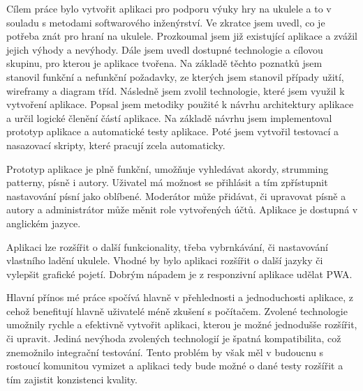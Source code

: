 \begin{conclusion}
    Cílem práce bylo vytvořit aplikaci pro podporu výuky hry na ukulele a to v souladu s metodami softwarového inženýrství. Ve zkratce jsem uvedl, co je potřeba znát pro hraní na ukulele. Prozkoumal jsem již existující aplikace a zvážil jejich výhody a nevýhody. Dále jsem uvedl dostupné technologie a cílovou skupinu, pro kterou je aplikace tvořena. Na základě těchto poznatků jsem stanovil funkční a nefunkční požadavky, ze kterých jsem stanovil případy užití, wireframy a diagram tříd. Následně jsem zvolil technologie, které jsem využil k vytvoření aplikace. Popsal jsem metodiky použité k návrhu architektury aplikace a určil logické členění částí aplikace. Na základě návrhu jsem implementoval prototyp aplikace a automatické testy aplikace. Poté jsem vytvořil testovací a nasazovací skripty, které pracují zcela automaticky.

    Prototyp aplikace je plně funkční, umožňuje vyhledávat akordy, strumming patterny, písně i autory. Uživatel má možnost se přihlásit a tím zpřístupnit nastavování písní jako oblíbené. Moderátor může přidávat, či upravovat písně a autory a administrátor může měnit role vytvořených účtů. Aplikace je dostupná v anglickém jazyce.

    Aplikaci lze rozšířit o další funkcionality, třeba vybrnkávání, či nastavování vlastního ladění ukulele. Vhodné by bylo aplikaci rozšířit o další jazyky či vylepšit grafické pojetí. Dobrým nápadem je z responzivní aplikace udělat PWA.

    Hlavní přínos mé práce spočívá hlavně v přehlednosti a jednoduchosti aplikace, z cehož benefitují hlavně uživatelé méně zkušení s počítačem. Zvolené technologie umožnily rychle a efektivně vytvořit aplikaci, kterou je možné jednodušše rozšířit, či upravit. Jediná nevýhoda zvolených technologií je špatná kompatibilita, což znemožnilo integrační testování. Tento problém by však měl v budoucnu s rostoucí komunitou vymizet a aplikaci tedy bude možné o dané testy rozšířit a tím zajistit konzistenci kvality.
\end{conclusion}